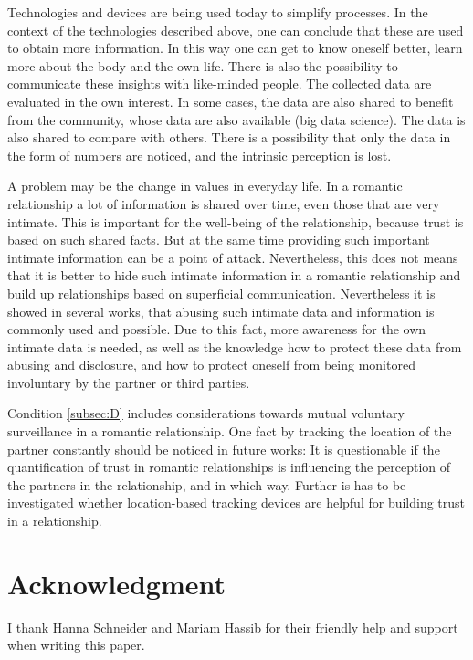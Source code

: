 \documentclass[journal]{vgtc}                %
\begin{document}
Technologies and devices are being used today to simplify processes. In the context of the technologies described above, one can conclude that these are used to obtain more information. In this way one can get to know oneself better, learn more about the body and the  own life. There is also the possibility to communicate these insights with like-minded people.
The collected data are evaluated in the own interest. In some cases, the data are also shared to benefit from the community, whose data are also available (big data science). The data is also shared to compare with others.
There is a possibility that only the data in the form of numbers are noticed, and the intrinsic perception is lost.

A problem may be the change in values in everyday life.
In a romantic relationship a lot of information is shared over time, even those that are very intimate. This is important for the well-being of the relationship, because  trust is based on such shared facts. But at the same time providing such important intimate information can be a point of attack. Nevertheless, this does not means that it is better to hide such intimate information in a romantic relationship and build up relationships based on superficial communication.
Nevertheless it is showed in several works, that abusing such intimate data and information is commonly used and possible. Due to this fact, more awareness for the own intimate data is needed, as well as the knowledge how to protect these data from abusing and disclosure, and how to protect oneself from being monitored involuntary by the partner or third parties.

Condition \ref{subsec:D} includes considerations towards mutual voluntary surveillance in a romantic relationship. One fact by tracking the location of the partner constantly should be noticed in future works: It is questionable if the quantification of trust in romantic relationships is influencing the perception of the partners in the relationship, and in which way. Further is has to be  investigated whether location-based tracking devices are helpful for building trust in a relationship.

\section*{Acknowledgment}
I thank Hanna Schneider and Mariam Hassib for their friendly help and support when writing this paper.

\printbibliography
\end{document}
